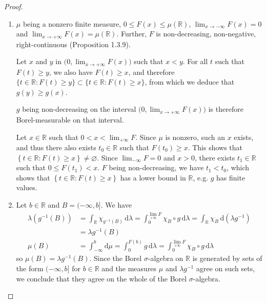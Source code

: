 \documentclass[11pt,a4paper,twoside]{article}
\begin{document}
\begin{proof}
  \hfill
  \begin{enumerate}
  \item
    $\mu$ being a nonzero finite measure, $0\leq
    F(x)\leq\mu(\mathbb{R})$, $\lim_{x\to{-\infty}}F(x)=0$ and
    $\lim_{x\to{+\infty}}F(x)=\mu(\mathbb{R})$. Further, $F$ is
    non-decreasing, non-negative, right-continuous (Proposition
    1.3.9).

    Let $x$ and $y$ in $\big(0,\lim_{x\to+\infty}F(x)\big)$ such
    that $x<y$. For all $t$ such that $F(t)\geq y$, we also have
    $F(t)\geq x$, and therefore $\{t\in\mathbb{R}:F(t)\geq y\} \subset
    \{t\in\mathbb{R}:F(t)\geq x\}$, from which we deduce that $g(y)\geq
    g(x)$.

    $g$ being non-decreasing on the interval
    $\big(0,\lim_{x\to+\infty}F(x)\big)$ is therefore Borel-measurable
    on that interval.

    Let $x\in\mathbb{R}$ such that $0<x<\lim_{+\infty}F$.
    Since $\mu$ is nonzero, such an $x$ exists, and thus there also
    exists $t_0\in\mathbb{R}$ such that $F(t_0)\geq x$.
    This shows that $\left\{t\in\mathbb{R}:F(t)\geq
    x\right\}\neq\varnothing$.
    Since $\lim_{-\infty}F=0$ and $x>0$, there exists
    $t_1\in\mathbb{R}$ such that $0\leq F(t_1)<x$. $F$ being
    non-decreasing, we have $t_1<t_0$, which shows that
    $\left\{t\in\mathbb{R}:F(t)\geq x\right\}$ has a lower bound in
    $\mathbb{R}$, e.g. $g$ has finite values.

  \item
    Let $b\in\mathbb{R}$ and $B=({-\infty},b]$.
      We have
      \begin{align*}
        \lambda\left(g^{-1}(B)\right) &=
        \int_{\mathbb{R}}\chi_{g^{-1}(B)}\,\mathrm{d}\lambda
        = \int_0^{\underset{+\infty}\lim F}\chi_B\circ g\,\mathrm{d}\lambda
        = \int_{\mathbb{R}}\chi_B\,\mathrm{d}\!\left(\lambda
        g^{-1}\right)\\
        &= \lambda g^{-1}(B)\\
        \mu(B) &= \int_{-\infty}^b\mathrm{d}\mu =
        \int_0^{F(b)}g\,\mathrm{d}\lambda =
        \int_0^{\underset{+\infty}\lim F}\chi_B\circ g\,\mathrm{d}\lambda
      \end{align*}
      so $\mu(B) = \lambda g^{-1}(B)$.
      Since the Borel $\sigma$-algebra on $\mathbb{R}$ is generated by
      sets of the form $({-\infty},b]$ for $b\in\mathbb{R}$ and the
      measures $\mu$ and $\lambda g^{-1}$ agree on such sets, we
      conclude that they agree on the whole of the Borel
      $\sigma$-algebra.
  \end{enumerate}
\end{proof}
\end{document}

